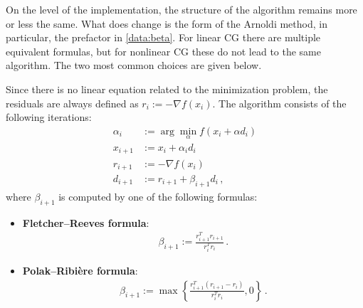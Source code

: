     On the level of the implementation, the structure of the algorithm remains more or less the same. What does change is the form of the Arnoldi method, in particular, the prefactor in \cref{data:beta}. For linear CG there are multiple equivalent formulas, but for nonlinear CG these do not lead to the same algorithm. The two most common choices are given below.
    \begin{method}[Nonlinear CG]
        Since there is no linear equation related to the minimization problem, the residuals are always defined as $r_i:=-\nabla f(x_i)$. The algorithm consists of the following iterations:
        \begin{align}
            \alpha_i &:= \arg\min_\alpha f(x_i+\alpha d_i)\label{data:argmin}\\
            x_{i+1} &:= x_i+\alpha_id_i\\
            r_{i+1} &:= -\nabla f(x_i)\\
            d_{i+1} &:= r_{i+1}+\beta_{i+1}d_i\,,
        \end{align}
        where $\beta_{i+1}$ is computed by one of the following formulas:
        \begin{itemize}
            \item \textbf{Fletcher--Reeves formula}:
                \begin{gather}
                    \beta_{i+1} := \frac{r_{i+1}^Tr_{i+1}}{r_i^Tr_i}\,.
                \end{gather}
            \item \textbf{Polak--Ribi\`ere formula}:
                \begin{gather}
                    \label{data:polak_ribiere}
                    \beta_{i+1} := \max\left\{\frac{r_{i+1}^T(r_{i+1}-r_i)}{r_i^Tr_i}, 0\right\}\,.
                \end{gather}
        \end{itemize}
    \end{method}

